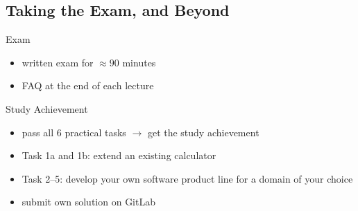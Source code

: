 


\subsection{Taking the Exam, and Beyond}

\begin{frame}[label=Exam]{\myframetitle}
	\begin{fancycolumns}
		\begin{definition}{Exam}
			\begin{itemize}
				\item written exam for $\approx 90$ minutes
				\item FAQ at the end of each lecture
			\end{itemize}
		\end{definition}
		\begin{definition}{Study Achievement} %
			\begin{itemize}
				\item pass all 6 practical tasks $\rightarrow$ get the study achievement
				\item Task 1a and 1b: extend an existing calculator
				\item Task 2--5: develop your own software product line for a domain of your choice
				\item submit own solution on GitLab
			\end{itemize}
		\end{definition}
	\nextcolumn
		


\end{fancycolumns}
\end{frame}
